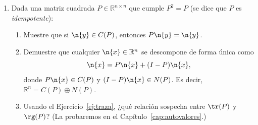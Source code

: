 \begin{enumerate}[leftmargin=*,label=\textbf{1.\arabic*}]
\item Dada una matriz cuadrada $P \in \mathbb{R}^{n \times n}$ que cumple $P^2 = P$ (se dice que $P$ es \emph{idempotente}):
\begin{enumerate}[label=\alph*)]
    \item Muestre que si $\n{y} \in C(P)$, entonces $P\n{y} = \n{y}$.
    \item Demuestre que cualquier $\n{x} \in \mathbb{R}^n$ se descompone de forma única como
    \[
    \n{x} = P\n{x} + (I - P)\n{x},
    \]
    donde $P\n{x} \in C(P)$ y $(I - P)\n{x} \in N(P)$. Es decir,
    $\mathbb{R}^n = C(P)\oplus N(P)$.
    \item Usando el Ejercicio~\ref{ej:traza}, ¿qué relación sospecha entre
    $\tr(P)$ y $\rg(P)$? (La probaremos en el Capítulo~\ref{cap:autovalores}.)
\end{enumerate}
\end{enumerate}
